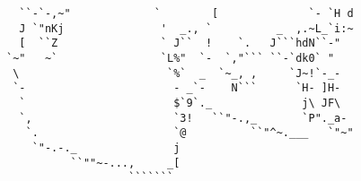 \documentclass[preview, varwidth]{standalone}
\begin{document}
\begin{small}
\begin{verbatim}
  ``-`-,~"             `        [              `- `H d            
  J `"nKj               '  _., `          _  ,.~L_`i:~            
  [  ``Z                ` J``  !    `.   J```hdN``-"              
`~"   ~`                `L%"  `-  `,"``` ``-`dk0` "               
 \                       `%`  _  `~_, ,     `J~!`-_-              
 `-                       - _`-    N```      `H- ]H-              
  `                       $`9`._              j\ JF\              
  `,                      `3!   ``"-.,_       `P"._a-             
   `.                     `@          ``"^~.___   `"~"            
    `"-.-._               j                                       
          ``""~-...,     _[                                       
                   ```````                                        
        
    \end{verbatim}
\end{small}
\end{document}

